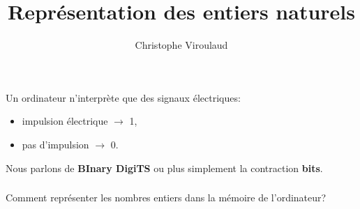 \documentclass[svgnames,11pt]{beamer}
\author[]{Christophe Viroulaud}
\title{Représentation des entiers naturels}
\date{\framebox{\textbf{DonRep 01}}}
\institute{Première - NSI}
\begin{document}
\begin{frame}
\titlepage
\end{frame}
\begin{frame}
    \frametitle{}

Un ordinateur n'interprète que des signaux électriques:
\begin{itemize}
    \item impulsion électrique $\rightarrow$ 1,
    \item pas d'impulsion $\rightarrow$ 0.
\end{itemize}
Nous parlons de \textbf{BInary DigiTS} ou plus simplement la contraction \textbf{bits}. 
\end{frame}
\begin{frame}
    \frametitle{}

    \begin{center}
        \begin{framed}
            Comment représenter les nombres entiers dans la mémoire de l'ordinateur?
        \end{framed}
    \end{center}

\end{frame}
\end{document}
